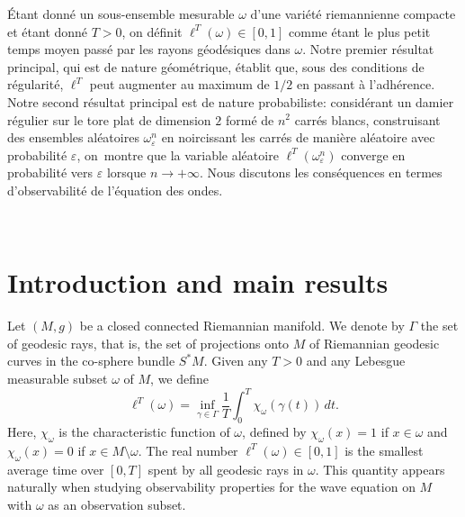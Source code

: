 \documentclass[JEP,XML,SOM,Unicode, NoEqCountersInSection,NoFloatCountersInSection,published]{cedram}
\theoremstyle{definition}
\begin{document}
\begin{altabstract}
Étant donné un sous-ensemble mesurable $\omega$ d'une variété riemannienne compacte et étant donné $T>0$, on définit $\ell^T(\omega)\in[0,1]$ comme étant le plus petit temps moyen passé par les rayons géodésiques dans $\omega$. Notre premier résultat principal, qui est de nature géométrique, établit que, sous des conditions de régularité, $\ell^T$ peut augmenter au maximum de $1/2$ en passant à l'adhérence. Notre second résultat principal est de nature probabiliste: considérant un damier régulier sur le tore plat de dimension $2$ formé de $n^2$ carrés blancs, construisant des ensembles aléatoires $\omega_\varepsilon^n$ en noircissant les carrés de manière aléatoire avec probabilité $\varepsilon$, on~montre que la variable aléatoire $\ell^T(\omega_\varepsilon^n)$ converge en probabilité vers $\varepsilon$ lorsque $n\rightarrow+\infty$. Nous discutons les conséquences en termes d'observabilité de l'équation des ondes.
\end{altabstract}




\maketitle
\vspace*{-\baselineskip}\enlargethispage{\baselineskip}%
\tableofcontents


\vspace*{-3.5\baselineskip}\mbox{ }
\section{Introduction and main results}\label{sec1}
Let $(M,g)$ be a closed connected Riemannian manifold.
We denote by $\Gamma$ the set of geodesic rays, that is, the set of projections onto $M$ of Riemannian geodesic curves in the co-sphere bundle $S^*M$.
Given any $T>0$ and any Lebesgue measurable subset $\omega$ of $M$, we define\vspace*{-3pt}
\begin{equation}\label{defg2}
\ell^T(\omega) = \inf_{\gamma\in\Gamma} \frac{1}{T} \int_0^T \chi_\omega(\gamma(t)) \, dt.
\end{equation}
Here, $\chi_\omega$ is the characteristic function of $\omega$, defined by $\chi_\omega(x)=1$ if $x\in\omega$ and $\chi_\omega(x)=0$ if $x\in M\setminus\omega$.
The real number $\ell^T(\omega)\in[0,1]$ is the smallest average time over $[0,T]$ spent by all geodesic rays in $\omega$.
This quantity appears naturally when studying observability properties for the wave equation on $M$ with $\omega$ as an observation subset.
\end{document}
